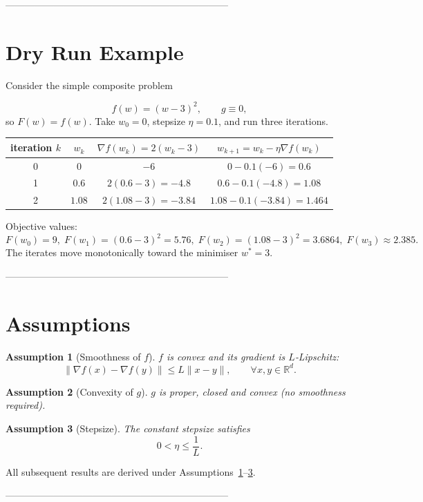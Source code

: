 \documentclass{article}
\newtheorem{assumption}{Assumption}
\newcommand{\R}{\mathbb{R}}
\begin{document}
---------------------------------------------------------------------

\section*{Dry Run Example}
Consider the simple composite problem  

\[
f(w)=(w-3)^{2},\qquad g\equiv0,
\]
so $F(w)=f(w)$.  
Take $w_{0}=0$, stepsize $\eta=0.1$, and run three iterations.

\begin{center}
\begin{tabular}{c|c|c|c}
iteration $k$ & $w_{k}$ & $\nabla f(w_{k})=2(w_{k}-3)$ & $w_{k+1}=w_{k}-\eta\nabla f(w_{k})$ \\ \hline
0 & $0$ & $-6$ & $0-0.1(-6)=0.6$ \\
1 & $0.6$ & $2(0.6-3)=-4.8$ & $0.6-0.1(-4.8)=1.08$ \\
2 & $1.08$ & $2(1.08-3)=-3.84$ & $1.08-0.1(-3.84)=1.464$ \\
\end{tabular}
\end{center}

Objective values:
\[
F(w_{0})=9,\;F(w_{1})=(0.6-3)^{2}=5.76,\;F(w_{2})=(1.08-3)^{2}=3.6864,\;F(w_{3})\approx2.385.
\]
The iterates move monotonically toward the minimiser $w^{*}=3$.

---------------------------------------------------------------------

\newpage
\section*{Assumptions}
\begin{assumption}[Smoothness of $f$]
\label{ass:smooth}
$f$ is convex and its gradient is $L$‑Lipschitz:
\[
\|\nabla f(x)-\nabla f(y)\|\le L\|x-y\|,\qquad\forall x,y\in\R^{d}.
\]
\end{assumption}
\begin{assumption}[Convexity of $g$]
\label{ass:convex}
$g$ is proper, closed and convex (no smoothness required).
\end{assumption}
\begin{assumption}[Stepsize]
\label{ass:stepsize}
The constant stepsize satisfies
\[
0<\eta\le\frac{1}{L}.
\]
\end{assumption}
All subsequent results are derived under Assumptions~\ref{ass:smooth}–\ref{ass:stepsize}.

---------------------------------------------------------------------
\end{document}
